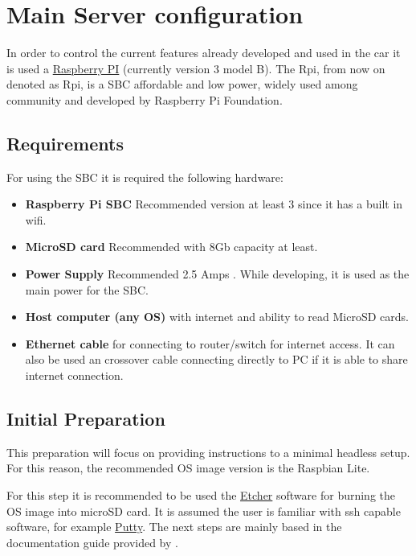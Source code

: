 \chapter{Main Server configuration}
\label{chapter:server}

In order to control the current features already developed and used in the car it is used a \href{https://www.raspberrypi.org/products/}{Raspberry PI} (currently version 3 model B). The \acrlong{Rpi}, from now on denoted as \acrshort{Rpi}, is a \gls{SBC} affordable and low power, widely used among community and developed by Raspberry Pi Foundation.

\section{Requirements}
For using the \gls{SBC} it is required the following hardware:
\begin{itemize}
	\tightlist
	\item \textbf{Raspberry Pi \gls{SBC}} Recommended version at least 3 since it has a built in wifi.
	\item \textbf{MicroSD card} Recommended with 8Gb capacity at least.
	\item \textbf{Power Supply} Recommended 2.5 Amps . While developing, it is used as the main power for the \gls{SBC}.
	\item \textbf{Host computer (any \gls{OS})} with internet and ability to read MicroSD cards.
	\item \textbf{Ethernet cable} for connecting to router/switch for internet access. It can also be used an crossover cable connecting directly to PC if it is able to share internet connection.
\end{itemize}

\section{Initial Preparation}
This preparation will focus on providing instructions to a minimal headless setup. For this reason, the recommended \gls{OS} image version is the Raspbian Lite.

For this step it is recommended to be used the \href{https://etcher.io/}{Etcher} software for burning the \gls{OS} image into microSD card. It is assumed the user is familiar with ssh capable software, for example \href{https://www.putty.org/}{Putty}. 
The next steps are mainly based in the documentation guide provided by \cite{raspberry_install_guide}.


